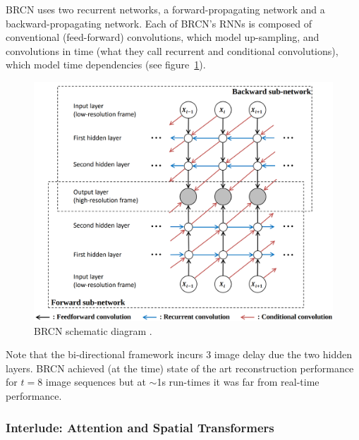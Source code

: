 BRCN uses two recurrent networks, a forward-propagating network and a backward-propagating network.
%
Each of BRCN's RNNs is composed of conventional (feed-forward) convolutions, which model up-sampling, and convolutions in time (what they call recurrent and conditional convolutions), which model time dependencies (see figure~\ref{fig:brcn}).
\begin{figure}[!htbp]
    \includegraphics[width=.49\textwidth]{figures/neural_networks/brcn.png}
    \caption{BRCN schematic diagram \cite{huang2015bidirectional}.}\label{fig:brcn}
\end{figure}
%
Note that the bi-directional framework incurs 3 image delay due the two hidden layers.
%
BRCN achieved (at the time) state of the art reconstruction performance for \(t=8\) image sequences but at \(\sim\)1s run-times it was far from real-time performance.




\subsubsection{Interlude: Attention and Spatial Transformers}\label{subsubsec:spatialtrans}


